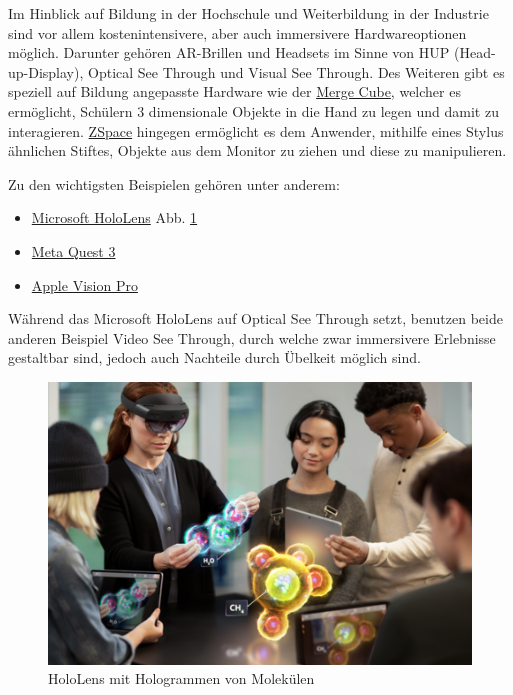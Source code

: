 \documentclass[conference]{IEEEtran}
\begin{document}
Im Hinblick auf Bildung in der Hochschule und Weiterbildung in der Industrie sind vor allem kostenintensivere,
aber auch immersivere Hardwareoptionen möglich. Darunter gehören AR-Brillen und Headsets im Sinne von HUP (Head-up-Display),
Optical See Through und Visual See Through. Des Weiteren gibt es speziell auf Bildung angepasste Hardware wie der 
\href{https://mergeedu.com/cube?cr=4646}{Merge Cube}, welcher es ermöglicht, Schülern 3 dimensionale Objekte in die Hand zu
legen und damit zu interagieren. \href{https://zspace.com/}{ZSpace} hingegen ermöglicht es dem Anwender, mithilfe eines Stylus ähnlichen Stiftes, Objekte aus dem Monitor zu ziehen und diese zu manipulieren. \cite{b12}

Zu den wichtigsten Beispielen gehören unter anderem:
\begin{itemize}
    \item \href{https://www.microsoft.com/de-de/hololens}{Microsoft HoloLens} Abb. \ref{fig2}
    \item \href{https://www.meta.com/de/quest/quest-3/}{Meta Quest 3}
    \item \href{https://www.apple.com/de/apple-vision-pro/}{Apple Vision Pro}
\end{itemize}

Während das Microsoft HoloLens auf Optical See Through setzt, benutzen beide anderen Beispiel Video See Through, durch welche
zwar immersivere Erlebnisse gestaltbar sind, jedoch auch Nachteile durch Übelkeit möglich sind.

\begin{figure}[htbp]
    \centerline{\includegraphics[scale=0.2]{img/holo.png}}
    \caption{HoloLens mit Hologrammen von Molekülen \cite{w3}}
    \label{fig2}
\end{figure}
\end{document}
